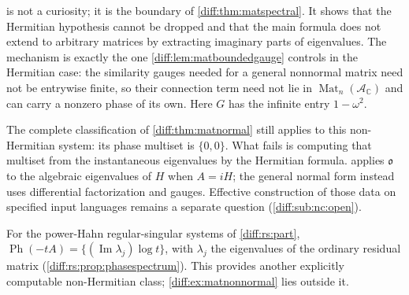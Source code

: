 \documentclass[11pt,letterpaper]{article}
\numberwithin{equation}{section}
\theoremstyle{definition}
\theoremstyle{remark}
\newcommand{\C}{\mathbb C}
\newcommand{\Acl}{\mathcal A}
\newcommand{\Obs}{\mathfrak o}
\newcommand{\Imm}{\operatorname{Im}}
\newcommand{\Mat}{\operatorname{Mat}}
\newcommand{\Ph}{\operatorname{Ph}}
\begin{document}
\begin{warning}
\label{diff:warn:matnonnormal}
 is not a curiosity; it is the boundary of
\cref{diff:thm:matspectral}. It shows that the Hermitian hypothesis cannot be
dropped and that the main formula does not extend to arbitrary matrices by
extracting imaginary parts of eigenvalues. The mechanism is exactly the one
\cref{diff:lem:matboundedgauge} controls in the Hermitian case: the similarity
gauges needed for a general nonnormal matrix need not be entrywise finite, so
their connection term need not lie in $\Mat_{n}(\Acl_{\C})$ and can carry a
nonzero phase of its own. Here $G$ has the infinite entry $1-\omega^{2}$.

The complete classification of \cref{diff:thm:matnormal} still applies to
this non-Hermitian system: its phase multiset is $\{0,0\}$. What fails is
computing that multiset from the instantaneous eigenvalues by the Hermitian
formula.  applies $\Obs$ to the algebraic
eigenvalues of $H$ when $A=iH$; the general normal form instead uses
differential factorization and gauges. Effective construction of those data
on specified input languages remains a separate question
(\cref{diff:sub:nc:open}).

For the power-Hahn regular-singular systems of \cref{diff:rs:part},
$\Ph(-tA)=\{(\Imm\lambda_j)\log t\}$, with $\lambda_j$ the eigenvalues
of the ordinary residual matrix (\cref{diff:rs:prop:phasespectrum}). This
provides another explicitly computable non-Hermitian class;
\cref{diff:ex:matnonnormal} lies outside it.
\end{warning}
\end{document}
